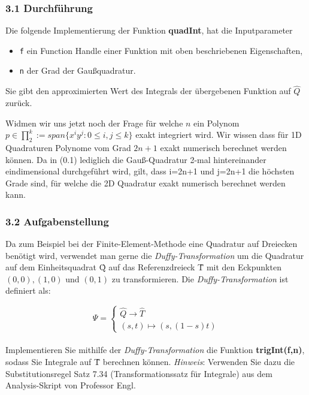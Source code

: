 \documentclass[a4paper,11pt,bibliography=totoc,listof=totoc,headinclude=true,cleardoublepage=empty,oneside]{scrbook}
\newcommand{\code}[1]{\texttt{\color{change}#1}}
\begin{document}
\subsubsection{3.1 Durchführung}

Die folgende Implementierung der Funktion \textbf{quadInt}, hat die Inputparameter
\begin{itemize}
	\item \code{f} ein Function Handle einer Funktion mit oben beschriebenen Eigenschaften,
	\item \code{n} der Grad der Gaußquadratur.
\end{itemize} 
Sie gibt den approximierten Wert des Integrals der übergebenen Funktion auf $\hat{Q}$ zurück.
{\color{change}		
 
		
%
}
Widmen wir uns jetzt noch der Frage für welche $n$ ein Polynom $ p \in \prod_{2}^k:=span\{x^iy^j:0 \leq i,j\leq k \} $ exakt integriert wird.		
Wir wissen dass für 1D Quadraturen Polynome vom Grad $2n+1$ exakt numerisch berechnet werden können. Da in (0.1) lediglich die Gauß-Quadratur 2-mal hintereinander eindimensional durchgeführt wird, gilt, dass i=2n+1 und j=2n+1 die höchsten Grade sind, für welche die 2D Quadratur exakt numerisch berechnet werden kann.


\subsubsection{3.2 Aufgabenstellung}
		Da zum Beispiel bei der Finite-Element-Methode eine Quadratur auf Dreiecken benötigt wird, verwendet man gerne die \textit{Duffy-Transformation} um die Quadratur auf dem Einheitsquadrat \^{Q} auf das Referenzdreieck \^{T} mit den Eckpunkten $ (0,0),(1,0)$ und $ (0,1)$ zu transformieren.
		Die \textit{Duffy-Transformation} ist definiert als:
		
		\begin{equation} 
		\Psi = \begin{cases} 
		\hat{Q} \to \hat{T} \\
		(s,t) \mapsto (s,(1-s)t)
		\end{cases} 
		\end{equation} 
		\\
		Implementieren Sie mithilfe der \textit{Duffy-Transformation} die Funktion \textbf{trigInt(f,n)}, sodass Sie Integrale auf \^{T} berechnen können.
		\textit{Hinweis}: Verwenden Sie dazu die Substitutionsregel Satz 7.34 (Transformationssatz für Integrale) aus dem Analysis-Skript von Professor Engl.
		
\end{document}
